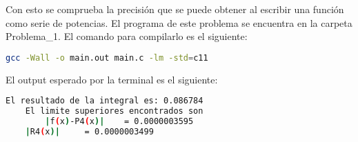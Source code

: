 Con esto se comprueba la precisión que se puede obtener al escribir una función como serie de potencias.
El programa de este problema se encuentra en la carpeta \textcolor{citecolor}{Problema\_1}. El comando para compilarlo es el siguiente:

\begin{lstlisting}[language=bash]
    gcc -Wall -o main.out main.c -lm -std=c11
\end{lstlisting}

El output esperado por la terminal es el siguiente:
\begin{lstlisting}[language=bash]
    El resultado de la integral es:	0.086784
    El limite superiores encontrados son
    	|f(x)-P4(x)|	= 0.0000003595
	|R4(x)|		= 0.0000003499
\end{lstlisting}
